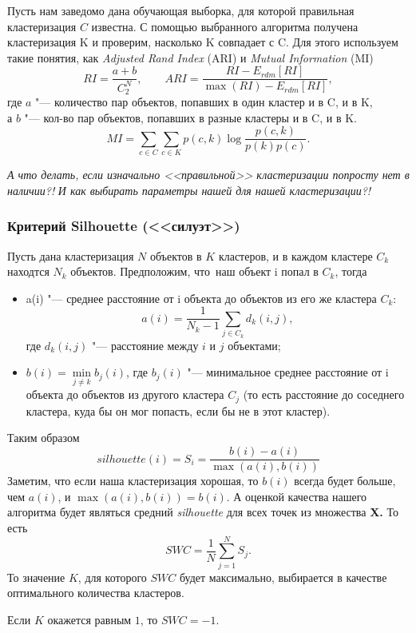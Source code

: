 Пусть нам заведомо дана обучающая выборка, для которой правильная кластеризация $C$ известна. С помощью выбранного алгоритма получена кластеризация K и проверим, насколько K совпадает с C. Для этого используем такие понятия, как {\it Adjusted Rand Index} (ARI) и {\it Mutual Information} (MI)
\[
RI = \frac{a+b}{C^N_2}, \qquad ARI = \frac{RI - E_{rdm}[RI]}{\max(RI) - E_{rdm}[RI]},
\]
где $a$ "--- количество пар объектов, попавших в один кластер и в C, и в K,\\
а $b$ "--- кол-во пар объектов, попавших в разные кластеры и в C, и в K.
\[
MI = \sum\limits_{c \in C}\sum\limits_{c \in K} p(c,k) \log \frac{p(c,k)}{p(k)p(c)}.
\]


{\it А что делать, если изначально <<правильной>> кластеризации попросту нет в наличии?!} {\it И как выбирать параметры нашей для нашей кластеризации?!}

\subsubsection{Критерий Silhouette (<<силуэт>>)}
Пусть дана кластеризация $N$ объектов в $K$ кластеров, и в каждом кластере $C_k$ находтся $N_k$ объектов. Предположим, что~наш объект i попал в $C_k$, тогда
\begin{itemize}
\item a(i) "--- среднее расстояние от i объекта до объектов из его же кластера $C_k$:
\[
a(i) = \frac{1}{N_{k} - 1} \sum\limits_{j \in C_k } d_k(i,j),
\]
где $d_k(i,j)$ "--- расстояние между $i$ и $j$ объектами; 
\item $b(i) = \min\limits_{j \not= k} b_{j}(i)$, где $b_{j}(i)$ "--- минимальное среднее расстояние от i объекта до объектов из другого кластера $C_j$ (то есть расстояние до соседнего кластера, куда бы он мог попасть, если бы не в этот кластер).
\end{itemize}
Таким образом
\[
silhouette(i) = S_i = \frac{b(i) - a(i)}{\max \left(a(i),b(i)\right)} 
\]
Заметим, что если наша кластеризация хорошая, то $b(i)$  всегда будет больше, чем $a(i)$, и $\max(a(i),b(i)) = b(i)$.
А оценкой качества нашего алгоритма будет являться средний {\it silhouette} для всех точек из множества {\bf X.} То есть
\[
SWC = \frac{1}{N} \sum\limits_{j = 1}^{N} S_j.
\]
То значение $K$, для которого $SWC$ будет максимально, выбирается в качестве оптимального количества кластеров.
\begin{Zam}
Если $K$ окажется равным $1$, то $SWC = -1$.
\end{Zam}

